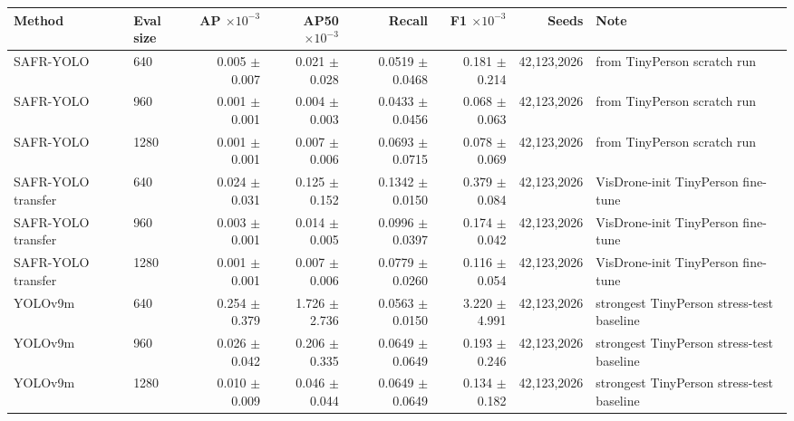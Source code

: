 \begin{tabular}{llrrrrrl}
\toprule
Method & Eval size & AP $\times 10^{-3}$ & AP50 $\times 10^{-3}$ & Recall & F1 $\times 10^{-3}$ & Seeds & Note \\
\midrule
SAFR-YOLO & 640 & 0.005 $\pm$ 0.007 & 0.021 $\pm$ 0.028 & 0.0519 $\pm$ 0.0468 & 0.181 $\pm$ 0.214 & 42,123,2026 & from TinyPerson scratch run \\
SAFR-YOLO & 960 & 0.001 $\pm$ 0.001 & 0.004 $\pm$ 0.003 & 0.0433 $\pm$ 0.0456 & 0.068 $\pm$ 0.063 & 42,123,2026 & from TinyPerson scratch run \\
SAFR-YOLO & 1280 & 0.001 $\pm$ 0.001 & 0.007 $\pm$ 0.006 & 0.0693 $\pm$ 0.0715 & 0.078 $\pm$ 0.069 & 42,123,2026 & from TinyPerson scratch run \\
SAFR-YOLO transfer & 640 & 0.024 $\pm$ 0.031 & 0.125 $\pm$ 0.152 & 0.1342 $\pm$ 0.0150 & 0.379 $\pm$ 0.084 & 42,123,2026 & VisDrone-init TinyPerson fine-tune \\
SAFR-YOLO transfer & 960 & 0.003 $\pm$ 0.001 & 0.014 $\pm$ 0.005 & 0.0996 $\pm$ 0.0397 & 0.174 $\pm$ 0.042 & 42,123,2026 & VisDrone-init TinyPerson fine-tune \\
SAFR-YOLO transfer & 1280 & 0.001 $\pm$ 0.001 & 0.007 $\pm$ 0.006 & 0.0779 $\pm$ 0.0260 & 0.116 $\pm$ 0.054 & 42,123,2026 & VisDrone-init TinyPerson fine-tune \\
YOLOv9m & 640 & 0.254 $\pm$ 0.379 & 1.726 $\pm$ 2.736 & 0.0563 $\pm$ 0.0150 & 3.220 $\pm$ 4.991 & 42,123,2026 & strongest TinyPerson stress-test baseline \\
YOLOv9m & 960 & 0.026 $\pm$ 0.042 & 0.206 $\pm$ 0.335 & 0.0649 $\pm$ 0.0649 & 0.193 $\pm$ 0.246 & 42,123,2026 & strongest TinyPerson stress-test baseline \\
YOLOv9m & 1280 & 0.010 $\pm$ 0.009 & 0.046 $\pm$ 0.044 & 0.0649 $\pm$ 0.0649 & 0.134 $\pm$ 0.182 & 42,123,2026 & strongest TinyPerson stress-test baseline \\
\bottomrule
\end{tabular}
